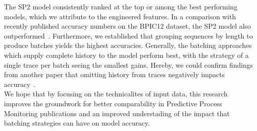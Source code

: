 The SP2 model consistently ranked at the top or among the best performing models, which we attribute to the engineered features. In a comparison with recently published accuracy numbers on the BPIC12 dataset, the SP2 model also outperformed~\cite{boehmer2018probability, evermann2016}. Furthermore, we established that grouping sequences by length to produce batches yields the highest accuracies. Generally, the batching approaches which supply complete history to the model perform best, with the strategy of a single trace per batch seeing the smallest gains. Hereby, we could confirm findings from another paper that omitting history from traces negatively impacts accuracy~\cite{klinkmuller2018reliablemonitoring}.\\

We hope that by focusing on the technicalites of input data, this research improves the groundwork for better comparability in Predictive Process Monitoring publications and an improved understading of the impact that batching strategies can have on model accuracy.
